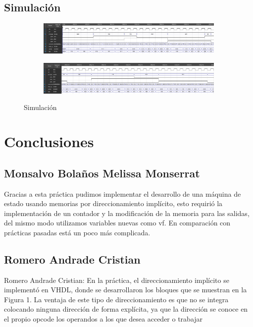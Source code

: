 \documentclass[table]{scrartcl}
\begin{document}
\subsection{Simulación}\label{sec:simulacion}
\begin{figure}[H]
  \centering
  \begin{subfigure}
    \centering
    \includegraphics[width=\textwidth]{./img/sim1}
  \end{subfigure}

  \begin{subfigure}
    \centering
    \includegraphics[width=\textwidth]{./img/sim2}
  \end{subfigure}
  \caption{Simulación}
  \label{fig:sim}
\end{figure}

\section{Conclusiones}
\label{sec:orgdab2190}

\subsection*{Monsalvo Bolaños Melissa Monserrat}\label{sec:mons-bolan-melissa}
Gracias a esta práctica pudimos implementar el desarrollo de una máquina de
estado usando memorias por direccionamiento implícito, esto requirió la
implementación de un contador y la modificación de la memoria para las salidas,
del mismo modo utilizamos variables nuevas como vf. En comparación con prácticas
pasadas está un poco más complicada.

\subsection*{Romero Andrade Cristian}\label{sec:romero-andr-crist}

Romero Andrade Cristian: En la práctica, el direccionamiento implícito se
implementó en VHDL, donde se desarrollaron los bloques que se muestran en la
Figura 1. La ventaja de este tipo de direccionamiento es que no se integra
colocando ninguna dirección de forma explícita, ya que la dirección se conoce en
el propio opcode los operandos a los que desea acceder o trabajar
\end{document}
